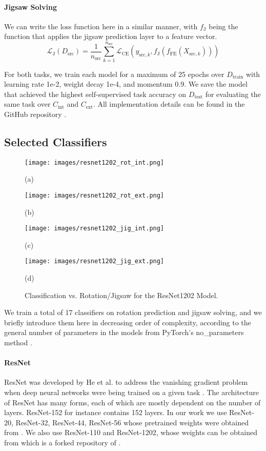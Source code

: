 \documentclass{article}
\begin{document}
\paragraph{Jigsaw Solving} We can write the loss function here in a similar manner, with $f_\text{J}$ being the function that applies the jigsaw prediction layer to a feature vector.
\begin{equation}
  \mathcal{L}_\text{J}(D_\text{src}) = \frac{1}{n_\text{src}}\sum_{k = 1}^{n_\text{src}} \mathcal{L}_\text{CE}(y_{\text{src}, k}, f_\text{J}(f_\text{FE}(X_{\text{src}, k})))
\end{equation}

For both tasks, we train each model for a maximum of 25 epochs over $D_\text{train}$ with learning rate 1e-2, weight decay 1e-4, and momentum 0.9. We save the model that achieved the highest self-supervised task accuracy on $D_\text{test}$ for evaluating the same task over $C_\text{int}$ and $C_\text{ext}$. All implementation details can be found in the GitHub repository \cite{Koh-u7122029-autoeval-baselines}.

\subsection{Selected Classifiers}\label{sec:sc}
\begin{figure}[!t]
    \texttt{[image: images/resnet1202\_rot\_int.png]}
    \caption*{(a)}
  \endminipage\hfill
    \texttt{[image: images/resnet1202\_rot\_ext.png]}
    \caption*{(b)}
  \endminipage
  \vfill
    \texttt{[image: images/resnet1202\_jig\_int.png]}
    \caption*{(c)}
  \endminipage\hfill
    \texttt{[image: images/resnet1202\_jig\_ext.png]}
    \caption*{(d)}
  \endminipage
  \caption{Classification vs. Rotation/Jigsaw for the ResNet1202 Model.}\label{fig:samples}
\end{figure}
We train a total of 17 classifiers on rotation prediction and jigsaw solving, and we briefly introduce them here in decreasing order of complexity, according to the general number of parameters in the models from PyTorch's no\_parameters method \cite{NEURIPS2019_9015}.
\paragraph{ResNet} ResNet was developed by He et al. to address the vanishing gradient problem when deep neural networks were being trained on a given task \cite{DBLP:journals/corr/HeZRS15}. The architecture of ResNet has many forms, each of which are mostly dependent on the number of layers. ResNet-152 for instance contains 152 layers. In our work we use ResNet-20, ResNet-32, ResNet-44, ResNet-56 whose pretrained weights were obtained from \cite{Chen-pytorch-cifar-models}. We also use ResNet-110 and ResNet-1202, whose weights can be obtained from \cite{Koh-pytorch-resnet-cifar10} which is a forked repository of \cite{Idelbayev18a}.
\end{document}

